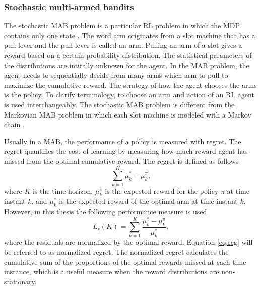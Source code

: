 \documentclass[english, 12pt, a4paper, elec, utf8, a-1b, online]{aaltothesis}
\numberwithin{equation}{section}
\newcommand{\regret}{L_r}
\begin{document}
\subsubsection{Stochastic multi-armed bandits}\label{sec:MAB}

The stochastic MAB problem is a particular RL problem in which the MDP contains only one state \cite{Sutton2018}.
The word arm originates from a slot machine that has a pull lever and the pull lever is called an arm.
Pulling an arm of a slot gives a reward based on a certain probability distribution. 
The statistical parameters of the distributions are intitally unknown for the agent.
In the MAB problem, the agent needs to sequentially decide from many arms which arm to pull to maximize the cumulative reward.
The strategy of how the agent chooses the arms is the policy.
To clarify terminology, to choose an arm and action of an RL agent is used interchangeably.
The stochastic MAB problem is different from the Markovian MAB problem in which each slot machine is modeled with a Markov chain \cite{Katehakis1987}.

Usually in a MAB, the performance of a policy is measured with regret.
The regret quantifies the cost of learning by measuring how much reward agent has missed from the optimal cumulative reward.
The regret is defined as follows
\begin{equation*}
    \sum_{k=1}^K \mu^*_k - \mu^\pi_k,
\end{equation*}
where $K$ is the time horizon, $\mu^\pi_k$ is the expected reward for the policy $\pi$ at time instant $k$, and $\mu_k^*$ is the expected reward of the optimal arm at time instant $k$.
However, in this thesis the following performance measure is used
\begin{equation}\label{eq:reg}
    \regret(K) = \sum_{k=1}^K \frac{\mu^*_k - \mu^\pi_k}{\mu^*_k},
\end{equation}
where the residuals are normalized by the optimal reward.
Equation \eqref{eq:reg} will be referred to as normalized regret.
The normalized regret calculates the cumulative sum of the proportions of the optimal rewards missed at each time instance, which is a useful measure when the reward distributions are non-stationary.
\end{document}
